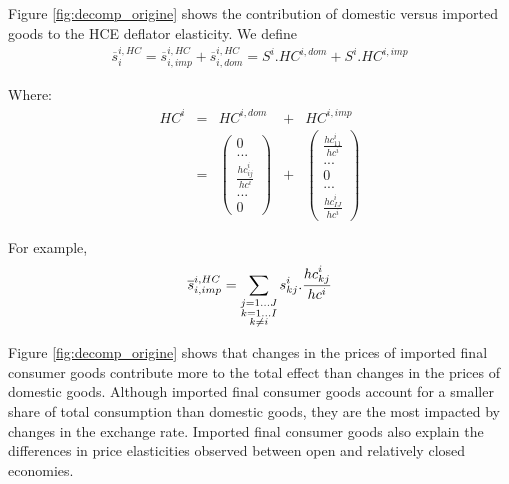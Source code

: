 \documentclass[12pt,a4paper]{paper}
\begin{document}
Figure \ref{fig:decomp_origine} shows the contribution of domestic versus imported goods to the HCE deflator elasticity.
We define 
\begin{eqnarray}
\overline{s}_i^{i,HC}=\overline{s}_{i,imp}^{i,HC} + \overline{s}_{i,dom}^{i,HC} = S^i.HC^{i,dom}+ S^i.HC^{i,imp}
\label{equ:decomp_impexp}
\end{eqnarray}

Where:
\begin{equation}
\begin{array}{ccccc}
HC^i&=&HC^{i,dom} & + &  HC^{i,imp} \\ 
&=&  \left( \begin{array}{c}
	0 \\
	...\\
	\frac{{hc}_{ij}^i}{hc^i}\\
	...\\
	0
	 \end{array}
	 \right)
&+&
\left( 	\begin{array}{c} \frac{{hc}_{11}^i}{hc^i} \\	...\\0\\...\\\frac{{hc}_{IJ}^i}{hc^i}\end{array}\right) 
\end{array}
\end{equation}

For example,
\begin{equation}
\overline{s}_{i,imp}^{i,HC} = \underset{\begin{subarray}{c}j=1 \dots J   \\ k=1 \dots I \\ k \neq i \end{subarray}}{\mathop \sum}\,{{s}_{kj}^i}.\frac{{hc}_{kj}^i}{hc^i}
\label{equ:share_of_imported}
 \end{equation}


Figure \ref{fig:decomp_origine} shows that changes in the prices of imported final consumer goods contribute more to the total effect than changes in the prices of domestic goods.
Although imported final consumer goods account for a smaller share of total consumption than domestic goods, they are the most impacted by changes in the exchange rate. 
Imported final consumer goods also explain the differences in price elasticities observed between open and relatively closed economies.\\
\end{document}

